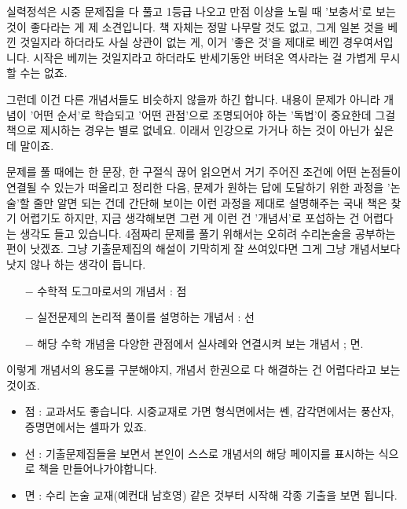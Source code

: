 실력정석은 시중 문제집을 다 풀고 1등급 나오고 만점 이상을 노릴 때 '보충서'로 보는 것이 좋다라는 게 제 소견입니다.
책 자체는 정말 나무랄 것도 없고, 그게 일본 것을 베낀 것일지라 하더라도 사실 상관이 없는 게, 이거 '좋은 것'을 제대로 베낀 경우여서입니다.
시작은 베끼는 것일지라고 하더라도 반세기동안 버텨온 역사라는 걸 가볍게 무시할 수는 없죠.
\vspace{5mm}

그런데 이건 다른 개념서들도 비슷하지 않을까 하긴 합니다.
내용이 문제가 아니라 개념이 '어떤 순서'로 학습되고 '어떤 관점'으로 조명되어야 하는 '독법'이 중요한데
그걸 책으로 제시하는 경우는 별로 없네요. 이래서 인강으로 가거나 하는 것이 아닌가 싶은데 말이죠.
\vspace{5mm}

문제를 풀 때에는 한 문장, 한 구절식 끊어 읽으면서 거기 주어진 조건에 어떤 논점들이 연결될 수 있는가 떠올리고 정리한 다음,
문제가 원하는 답에 도달하기 위한 과정을 '논술'할 줄만 알면 되는 건데
간단해 보이는 이런 과정을 제대로 설명해주는 국내 책은 찾기 어렵기도 하지만,
지금 생각해보면 그런 게 이런 건 '개념서'로 포섭하는 건 어렵다는 생각도 들고 있습니다.
4점짜리 문제를 풀기 위해서는 오히려 수리논술을 공부하는 편이 낫겠죠.
그냥 기출문제집의 해설이 기막히게 잘 쓰여있다면 그게 그냥 개념서보다 낫지 않나 하는 생각이 듭니다.
\vspace{5mm}

\begin{itemize}
    \item[$-$] 수학적 도그마로서의 개념서 : 점
    \item[$-$] 실전문제의 논리적 풀이를 설명하는 개념서 : 선
    \item[$-$] 해당 수학 개념을 다양한 관점에서 실사례와 연결시켜 보는 개념서 ; 면.
\end{itemize}
이렇게 개념서의 용도를 구분해야지, 개념서 한권으로 다 해결하는 건 어렵다라고 보는 것이죠.
\vspace{5mm}

\begin{itemize}
    \item 점 : 교과서도 좋습니다. 시중교재로 가면 형식면에서는 쎈, 감각면에서는 풍산자, 증명면에서는 셀파가 있죠.
    \item 선 : 기출문제집들을 보면서 본인이 스스로 개념서의 해당 페이지를 표시하는 식으로 책을 만들어나가야합니다.
    \item 면 : 수리 논술 교재(예컨대 남호영) 같은 것부터 시작해 각종 기출을 보면 됩니다.
\end{itemize}
\vspace{5mm}

